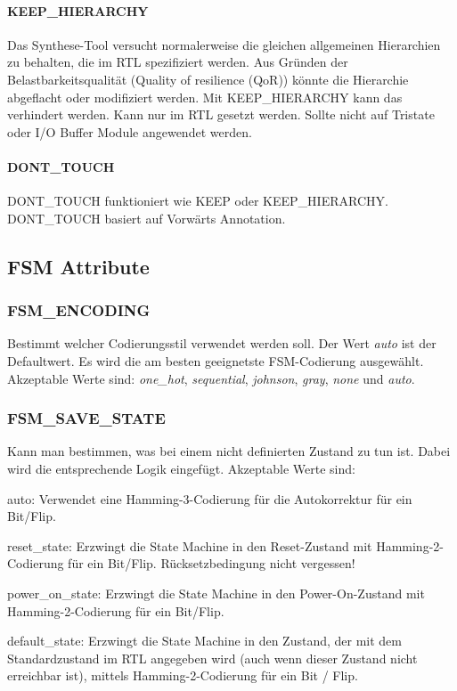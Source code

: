 \paragraph{KEEP\_HIERARCHY}
Das Synthese-Tool versucht normalerweise die gleichen allgemeinen Hierarchien zu behalten, die im RTL spezifiziert werden. Aus Gründen der Belastbarkeitsqualität (Quality of resilience (QoR)) könnte die Hierarchie abgeflacht oder modifiziert werden. Mit KEEP\_HIERARCHY kann das verhindert werden. Kann nur im RTL gesetzt werden. Sollte nicht auf Tristate oder I/O Buffer Module angewendet werden.

\paragraph{DONT\_TOUCH}
DONT\_TOUCH funktioniert wie KEEP oder KEEP\_HIERARCHY. DONT\_TOUCH basiert auf Vorwärts Annotation. 

\subsection{FSM Attribute}
\subsubsection{FSM\_ENCODING}
Bestimmt welcher Codierungsstil verwendet werden soll. Der Wert \textit{auto} ist der Defaultwert. Es wird die am besten geeignetste FSM-Codierung ausgewählt. Akzeptable Werte sind: \textit{one\_hot}, \textit{sequential}, \textit{johnson}, \textit{gray}, \textit{none} und \textit{auto}.

\subsubsection{FSM\_SAVE\_STATE}
Kann man bestimmen, was bei einem nicht definierten Zustand zu tun ist. Dabei wird die entsprechende Logik eingefügt. Akzeptable Werte sind: 
\begin{compactitem}
    \item auto: Verwendet eine Hamming-3-Codierung für die Autokorrektur für ein Bit/Flip.
    \item reset\_state: Erzwingt die State Machine in den Reset-Zustand mit Hamming-2-Codierung für ein Bit/Flip. Rücksetzbedingung nicht vergessen!
    \item power\_on\_state: Erzwingt die State Machine in den Power-On-Zustand mit Hamming-2-Codierung für ein Bit/Flip.
    \item default\_state: Erzwingt die State Machine in den Zustand, der mit dem Standardzustand im RTL angegeben wird (auch wenn dieser Zustand nicht erreichbar ist), mittels Hamming-2-Codierung für ein Bit / Flip.
\end{compactitem}

